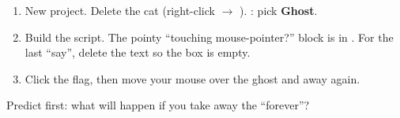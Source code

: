 \begin{exercise}
\begin{enumerate}[leftmargin=1.4em,itemsep=1pt]
  \item New project. Delete the cat (right-click $\rightarrow$ ). : pick \textbf{Ghost}.
  \item Build the script. The pointy \enquote{touching mouse-pointer?} block is in . For the last \enquote{say}, delete the text so the box is empty.
  \item Click the flag, then move your mouse over the ghost and away again.
\end{enumerate}
\begin{center}
\begin{scratch}[scale=0.85,else word=else]
\end{scratch}
\end{center}
Predict first: what will happen if you take away the \enquote{forever}? 
\end{exercise}

